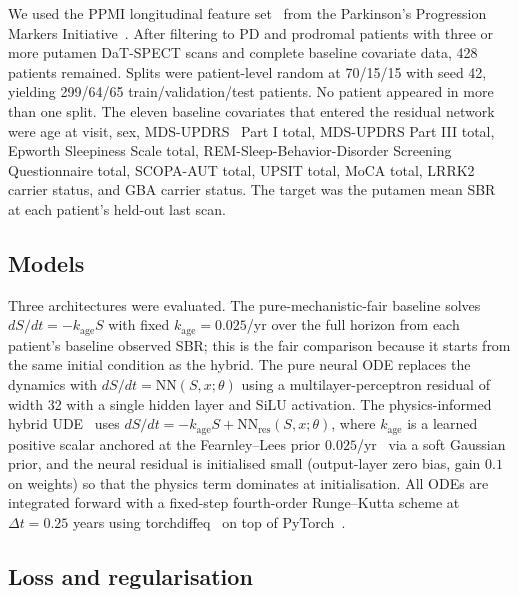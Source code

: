 We used the PPMI longitudinal feature set~\cite{dupre2026paper3} from the Parkinson's Progression Markers Initiative~\cite{marek2018ppmi, brumm2023milestone}. After filtering to PD and prodromal patients with three or more putamen DaT-SPECT scans and complete baseline covariate data, 428 patients remained. Splits were patient-level random at 70/15/15 with seed 42, yielding 299/64/65 train/validation/test patients. No patient appeared in more than one split. The eleven baseline covariates that entered the residual network were age at visit, sex, MDS-UPDRS~\cite{goetz2008mdsupdrs} Part I total, MDS-UPDRS Part III total, Epworth Sleepiness Scale total, REM-Sleep-Behavior-Disorder Screening Questionnaire total, SCOPA-AUT total, UPSIT total, MoCA total, LRRK2 carrier status, and GBA carrier status. The target was the putamen mean SBR at each patient's held-out last scan.

\subsection{Models}

Three architectures were evaluated. The pure-mechanistic-fair baseline solves $dS/dt = -k_{\mathrm{age}} S$ with fixed $k_{\mathrm{age}} = 0.025$/yr over the full horizon from each patient's baseline observed SBR; this is the fair comparison because it starts from the same initial condition as the hybrid. The pure neural ODE replaces the dynamics with $dS/dt = \mathrm{NN}(S, x; \theta)$ using a multilayer-perceptron residual of width 32 with a single hidden layer and SiLU activation. The physics-informed hybrid UDE~\cite{rackauckas2020universal, chen2018neuralode} uses $dS/dt = -k_{\mathrm{age}} S + \mathrm{NN}_{\mathrm{res}}(S, x; \theta)$, where $k_{\mathrm{age}}$ is a learned positive scalar anchored at the Fearnley--Lees prior $0.025$/yr~\cite{fearnleyLees1991} via a soft Gaussian prior, and the neural residual is initialised small (output-layer zero bias, gain $0.1$ on weights) so that the physics term dominates at initialisation. All ODEs are integrated forward with a fixed-step fourth-order Runge--Kutta scheme at $\Delta t = 0.25$ years using torchdiffeq~\cite{chen2021torchdiffeq} on top of PyTorch~\cite{paszke2019pytorch}.

\subsection{Loss and regularisation}

